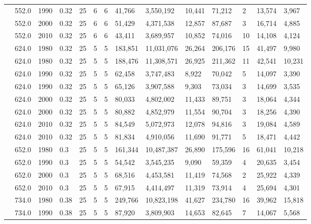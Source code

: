 \begin{table}[]
\begin{tabular}{|l|l|l|l|l|l|l|l|l|l|l|l|l|l|}
		& 552.0 & 1990 & 0.32 & 25 & 6 & 6 & 41,766 & 3,550,192 & 10,441 & 71,212 & 2 & 13,574 & 3,967 \\ \cline{2-14} 
		& 552.0 & 2000 & 0.32 & 25 & 6 & 6 & 51,429 & 4,371,538 & 12,857 & 87,687 & 3 & 16,714 & 4,885 \\ \cline{2-14} 
		& 552.0 & 2010 & 0.32 & 25 & 6 & 6 & 43,411 & 3,689,957 & 10,852 & 74,016 & 10 & 14,108 & 4,124 \\ \cline{2-14} 
		& 624.0 & 1980 & 0.32 & 25 & 5 & 5 & 183,851 & 11,031,076 & 26,264 & 206,176 & 15 & 41,497 & 9,980 \\ \cline{2-14} 
		& 624.0 & 1980 & 0.32 & 25 & 5 & 5 & 188,476 & 11,308,571 & 26,925 & 211,362 & 11 & 42,541 & 10,231 \\ \cline{2-14} 
		& 624.0 & 1990 & 0.32 & 25 & 5 & 5 & 62,458 & 3,747,483 & 8,922 & 70,042 & 5 & 14,097 & 3,390 \\ \cline{2-14} 
		& 624.0 & 1990 & 0.32 & 25 & 5 & 5 & 65,126 & 3,907,588 & 9,303 & 73,034 & 3 & 14,699 & 3,535 \\ \cline{2-14} 
		& 624.0 & 2000 & 0.32 & 25 & 5 & 5 & 80,033 & 4,802,002 & 11,433 & 89,751 & 3 & 18,064 & 4,344 \\ \cline{2-14} 
		& 624.0 & 2000 & 0.32 & 25 & 5 & 5 & 80,882 & 4,852,979 & 11,554 & 90,704 & 3 & 18,256 & 4,390 \\ \cline{2-14} 
		& 624.0 & 2010 & 0.32 & 25 & 5 & 5 & 84,549 & 5,072,973 & 12,078 & 94,816 & 3 & 19,084 & 4,589 \\ \cline{2-14} 
		& 624.0 & 2010 & 0.32 & 25 & 5 & 5 & 81,834 & 4,910,056 & 11,690 & 91,771 & 5 & 18,471 & 4,442 \\ \cline{2-14} 
		& 652.0 & 1980 & 0.3 & 25 & 5 & 5 & 161,344 & 10,487,387 & 26,890 & 175,596 & 16 & 61,041 & 10,218 \\ \cline{2-14} 
		& 652.0 & 1990 & 0.3 & 25 & 5 & 5 & 54,542 & 3,545,235 & 9,090 & 59,359 & 4 & 20,635 & 3,454 \\ \cline{2-14} 
		& 652.0 & 2000 & 0.3 & 25 & 5 & 5 & 68,516 & 4,453,581 & 11,419 & 74,568 & 2 & 25,922 & 4,339 \\ \cline{2-14} 
		& 652.0 & 2010 & 0.3 & 25 & 5 & 5 & 67,915 & 4,414,497 & 11,319 & 73,914 & 4 & 25,694 & 4,301 \\ \cline{2-14} 
		& 734.0 & 1980 & 0.38 & 25 & 5 & 5 & 249,766 & 10,823,198 & 41,627 & 234,780 & 16 & 39,962 & 15,818 \\ \cline{2-14} 
		& 734.0 & 1990 & 0.38 & 25 & 5 & 5 & 87,920 & 3,809,903 & 14,653 & 82,645 & 7 & 14,067 & 5,568 \\ \cline{2-14} 

\end{tabular}
\end{table}
